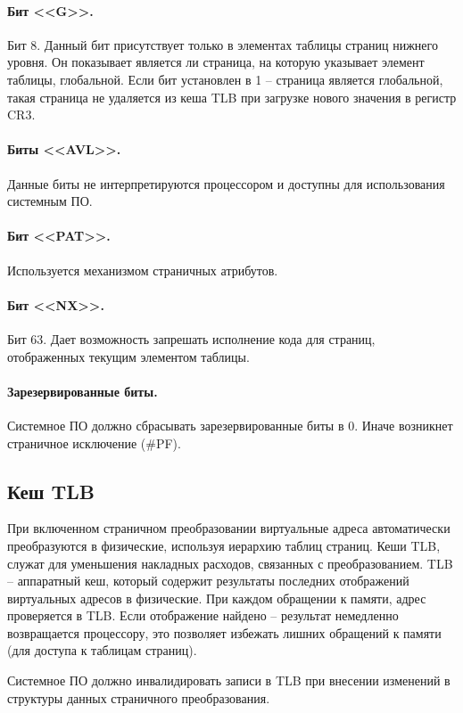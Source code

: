 \paragraph{Бит <<G>>.} Бит 8. Данный бит присутствует только в элементах таблицы страниц нижнего уровня. Он показывает является
ли страница, на которую указывает элемент таблицы, глобальной. Если бит установлен в 1 -- страница является
глобальной, такая страница не удаляется из кеша TLB при загрузке нового значения в регистр CR3.

\paragraph{Биты <<AVL>>.} Данные биты не интерпретируются процессором и доступны для использования системным ПО.

\paragraph{Бит <<PAT>>.} Используется механизмом страничных атрибутов.

\paragraph{Бит <<NX>>.} Бит 63. Дает возможность запрешать исполнение кода для страниц, отображенных текущим элементом таблицы.

\paragraph{Зарезервированные биты.} Системное ПО должно сбрасывать зарезервированные биты в 0. Иначе возникнет
страничное исключение (\#PF).

\subsection{Кеш TLB}
При включенном страничном преобразовании виртуальные адреса автоматически преобразуются в физические,
используя иерархию таблиц страниц. Кеши TLB, служат для уменьшения накладных расходов, связанных с преобразованием.
TLB -- аппаратный кеш, который содержит результаты последних отображений виртуальных адресов в физические.
При каждом обращении к памяти, адрес проверяется в TLB. Если отображение найдено -- результат немедленно возвращается
процессору, это позволяет избежать лишних обращений к памяти (для доступа к таблицам страниц).

Системное ПО должно инвалидировать записи в TLB при внесении изменений
в структуры данных страничного преобразования.

